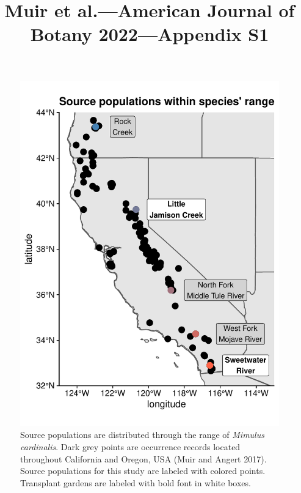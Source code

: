 \documentclass[
  12pt,
]{article}
\title{Muir et al.---American Journal of Botany 2022---Appendix S1}
\author{}
\date{\vspace{-2.5em}}
\makeatletter
\newcommand\iraggedright{%
  \let\\\@centercr\@rightskip\@flushglue \rightskip\@rightskip
  \leftskip\z@skip}
\makeatother
\begin{document}
\maketitle

\iraggedright

\newcommand{\pkg}[1]{{\fontseries{b}\selectfont #1}} 

\renewcommand\thefigure{S\arabic{figure}}    
\renewcommand\thetable{S\arabic{table}}    
\setcounter{figure}{0}    
\setcounter{table}{0}

\begin{figure}[ht]
  \includegraphics{figures/range-map.pdf}
  \caption{Source populations are distributed through the range of \textit{Mimulus cardinalis}. Dark grey points are occurrence records located throughout California and Oregon, USA (Muir and Angert 2017). Source populations for this study are labeled with colored points. Transplant gardens are labeled with bold font in white boxes.}
  \label{fig:range-map}
\end{figure}
\end{document}
